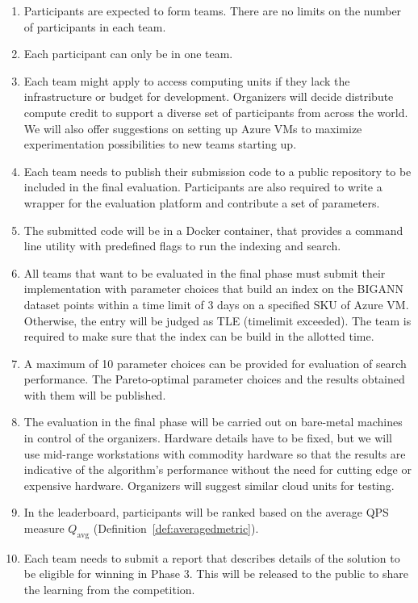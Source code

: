 \begin{enumerate}
  \item Participants are expected to form teams.  There are no limits
    on the number of participants in each team. %
\item Each participant can only be in one team.
\item Each team might apply to access computing units if they lack the
  infrastructure or budget for development. Organizers will decide
  distribute compute credit to support a diverse set of participants
  from across the world. We will also offer suggestions on setting up
  Azure VMs to maximize experimentation possibilities to new teams
  starting up.
\item Each team needs to publish their submission code to a public
  repository to be included in the final evaluation.  Participants are
  also required to write a wrapper for the evaluation platform and
  contribute a set of parameters.
  \item The submitted code will be in a Docker container, that provides a
    command line utility with predefined flags to run the indexing and
    search.
  \item All teams that want to be evaluated in the final phase must
    submit their implementation with parameter choices that build an
    index on the BIGANN dataset points within a time limit of 3
    days on a specified SKU of Azure VM. Otherwise, the entry will be judged as TLE (timelimit
    exceeded). The team is required to make sure that the index can
    be build in the allotted time.
\item A maximum of 10 parameter choices can be provided for evaluation
  of search performance. The Pareto-optimal parameter choices and the
  results obtained with them will be published.
  \item The evaluation in the final phase will be carried out on
    bare-metal machines in control of the organizers. Hardware details
    have to be fixed, but we will use mid-range workstations with
    commodity hardware so that the results are indicative of the
    algorithm's performance without the need for cutting edge or
    expensive hardware.  Organizers will suggest similar cloud units
    for testing.
  \item 
    In the leaderboard, participants will be ranked based on the average QPS measure $Q_\mathrm{avg}$ (Definition~\ref{def:averagedmetric}).
      \item Each team needs to submit a report that describes details of
    the solution to be eligible for winning in Phase 3. This will be
    released to the public to share the learning from the competition.


\end{enumerate}
